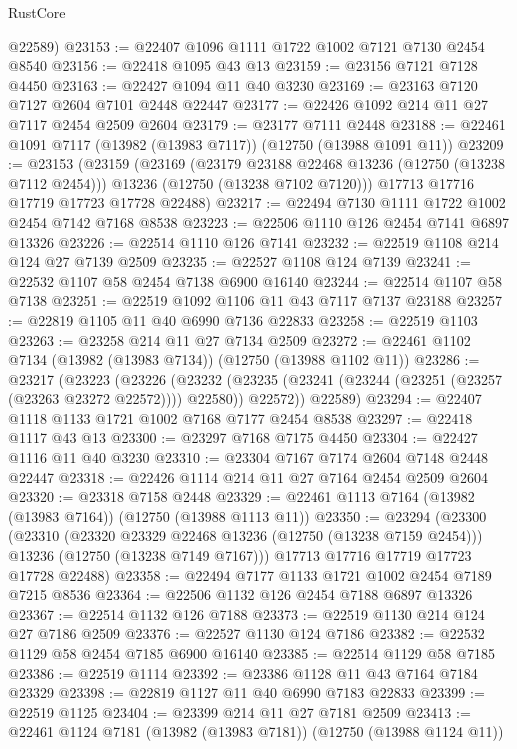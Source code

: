 \begin{lexlean}{RustCore}
\begin{coremodule}
      @22589)
@23153 := @22407 @1096 @1111 @1722 @1002 @7121 @7130 @2454 @8540
@23156 := @22418 @1095 @43 @13
@23159 := @23156 @7121 @7128 @4450
@23163 := @22427 @1094 @11 @40 @3230
@23169 := @23163 @7120 @7127 @2604 @7101 @2448 @22447
@23177 := @22426 @1092 @214 @11 @27 @7117 @2454 @2509 @2604
@23179 := @23177 @7111 @2448
@23188 := @22461 @1091 @7117 (@13982 (@13983 @7117)) (@12750 (@13988 @1091 @11))
@23209 := @23153
    (@23159
      (@23169
        (@23179 @23188 @22468 @13236 (@12750 (@13238 @7112 @2454)))
        @13236
        (@12750 (@13238 @7102 @7120)))
      @17713
      @17716
      @17719
      @17723
      @17728
      @22488)
@23217 := @22494 @7130 @1111 @1722 @1002 @2454 @7142 @7168 @8538
@23223 := @22506 @1110 @126 @2454 @7141 @6897 @13326
@23226 := @22514 @1110 @126 @7141
@23232 := @22519 @1108 @214 @124 @27 @7139 @2509
@23235 := @22527 @1108 @124 @7139
@23241 := @22532 @1107 @58 @2454 @7138 @6900 @16140
@23244 := @22514 @1107 @58 @7138
@23251 := @22519 @1092 @1106 @11 @43 @7117 @7137 @23188
@23257 := @22819 @1105 @11 @40 @6990 @7136 @22833
@23258 := @22519 @1103
@23263 := @23258 @214 @11 @27 @7134 @2509
@23272 := @22461 @1102 @7134 (@13982 (@13983 @7134)) (@12750 (@13988 @1102 @11))
@23286 := @23217
    (@23223
      (@23226
        (@23232 (@23235 (@23241 (@23244 (@23251 (@23257 (@23263 @23272 @22572)))) @22580)) @22572))
      @22589)
@23294 := @22407 @1118 @1133 @1721 @1002 @7168 @7177 @2454 @8538
@23297 := @22418 @1117 @43 @13
@23300 := @23297 @7168 @7175 @4450
@23304 := @22427 @1116 @11 @40 @3230
@23310 := @23304 @7167 @7174 @2604 @7148 @2448 @22447
@23318 := @22426 @1114 @214 @11 @27 @7164 @2454 @2509 @2604
@23320 := @23318 @7158 @2448
@23329 := @22461 @1113 @7164 (@13982 (@13983 @7164)) (@12750 (@13988 @1113 @11))
@23350 := @23294
    (@23300
      (@23310
        (@23320 @23329 @22468 @13236 (@12750 (@13238 @7159 @2454)))
        @13236
        (@12750 (@13238 @7149 @7167)))
      @17713
      @17716
      @17719
      @17723
      @17728
      @22488)
@23358 := @22494 @7177 @1133 @1721 @1002 @2454 @7189 @7215 @8536
@23364 := @22506 @1132 @126 @2454 @7188 @6897 @13326
@23367 := @22514 @1132 @126 @7188
@23373 := @22519 @1130 @214 @124 @27 @7186 @2509
@23376 := @22527 @1130 @124 @7186
@23382 := @22532 @1129 @58 @2454 @7185 @6900 @16140
@23385 := @22514 @1129 @58 @7185
@23386 := @22519 @1114
@23392 := @23386 @1128 @11 @43 @7164 @7184 @23329
@23398 := @22819 @1127 @11 @40 @6990 @7183 @22833
@23399 := @22519 @1125
@23404 := @23399 @214 @11 @27 @7181 @2509
@23413 := @22461 @1124 @7181 (@13982 (@13983 @7181)) (@12750 (@13988 @1124 @11))

\end{coremodule}
\end{lexlean}
